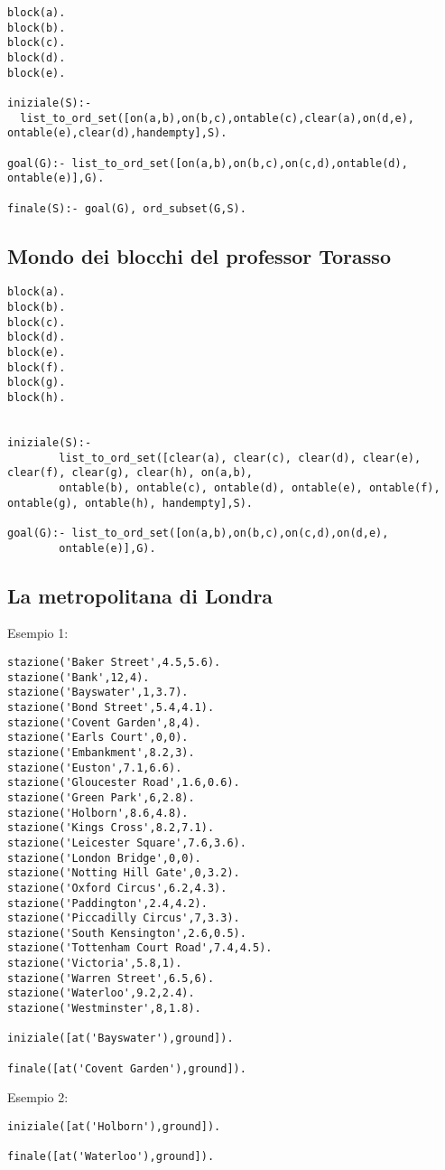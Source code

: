 \begin{lstlisting}
block(a).
block(b).
block(c).
block(d).
block(e).

iniziale(S):-
  list_to_ord_set([on(a,b),on(b,c),ontable(c),clear(a),on(d,e), ontable(e),clear(d),handempty],S).

goal(G):- list_to_ord_set([on(a,b),on(b,c),on(c,d),ontable(d), ontable(e)],G).

finale(S):- goal(G), ord_subset(G,S).
\end{lstlisting}

\subsection{Mondo dei blocchi del professor Torasso}

\begin{lstlisting}
block(a).
block(b).
block(c).
block(d).
block(e).
block(f).
block(g).
block(h).


iniziale(S):-
        list_to_ord_set([clear(a), clear(c), clear(d), clear(e), clear(f), clear(g), clear(h), on(a,b),
        ontable(b), ontable(c), ontable(d), ontable(e), ontable(f), ontable(g), ontable(h), handempty],S).

goal(G):- list_to_ord_set([on(a,b),on(b,c),on(c,d),on(d,e),
        ontable(e)],G).
\end{lstlisting}

\subsection{La metropolitana di Londra}

Esempio 1:

\begin{lstlisting}
stazione('Baker Street',4.5,5.6).
stazione('Bank',12,4).
stazione('Bayswater',1,3.7).
stazione('Bond Street',5.4,4.1).
stazione('Covent Garden',8,4).
stazione('Earls Court',0,0).
stazione('Embankment',8.2,3).
stazione('Euston',7.1,6.6).
stazione('Gloucester Road',1.6,0.6).
stazione('Green Park',6,2.8).
stazione('Holborn',8.6,4.8).
stazione('Kings Cross',8.2,7.1).
stazione('Leicester Square',7.6,3.6).
stazione('London Bridge',0,0).
stazione('Notting Hill Gate',0,3.2).
stazione('Oxford Circus',6.2,4.3).
stazione('Paddington',2.4,4.2).
stazione('Piccadilly Circus',7,3.3).
stazione('South Kensington',2.6,0.5).
stazione('Tottenham Court Road',7.4,4.5).
stazione('Victoria',5.8,1).
stazione('Warren Street',6.5,6).
stazione('Waterloo',9.2,2.4).
stazione('Westminster',8,1.8).

iniziale([at('Bayswater'),ground]).

finale([at('Covent Garden'),ground]).
\end{lstlisting}

Esempio 2:

\begin{lstlisting}
iniziale([at('Holborn'),ground]).

finale([at('Waterloo'),ground]).
\end{lstlisting}